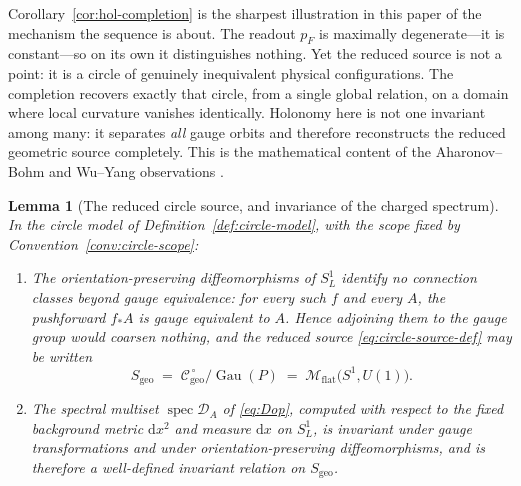 \documentclass[11pt,a4paper]{article}
\theoremstyle{plain}
\newtheorem{lemma}[theorem]{Lemma}
\theoremstyle{definition}
\theoremstyle{remark}
\newcommand{\Cgeo}{\mathcal{C}_{\mathrm{geo}}}
\newcommand{\Sgeo}{S_{\mathrm{geo}}}
\newcommand{\Gau}{\operatorname{Gau}}
\newcommand{\Mflat}{\mathcal{M}_{\mathrm{flat}}}
\begin{document}
Corollary~\ref{cor:hol-completion} is the sharpest illustration in this paper of the mechanism the
sequence is about. The readout $p_F$ is maximally degenerate---it is constant---so on its own it
distinguishes nothing. Yet the reduced source is not a point: it is a circle of genuinely
inequivalent physical configurations. The completion recovers exactly that circle, from a single
global relation, on a domain where local curvature vanishes identically. Holonomy here is not one
invariant among many: it separates \emph{all} gauge orbits and therefore reconstructs the reduced
geometric source completely. This is the mathematical content of the Aharonov--Bohm and Wu--Yang
observations \cite{AharonovBohm,WuYang}.

\begin{lemma}[The reduced circle source, and invariance of the charged spectrum]
\label{lem:spec-invariance}
In the circle model of Definition~\ref{def:circle-model}, with the scope fixed by
Convention~\ref{conv:circle-scope}:
\begin{enumerate}[label=(\arabic*),leftmargin=2.2em]
\item The orientation-preserving diffeomorphisms of $S^1_L$ identify no connection classes beyond
      gauge equivalence: for every such $f$ and every $A$, the pushforward $f_*A$ is gauge
      equivalent to $A$. Hence adjoining them to the gauge group would coarsen nothing, and the
      reduced source \eqref{eq:circle-source-def} may be written
      \begin{equation}
      \label{eq:Sgeo-circle}
      \Sgeo \;=\; \Cgeo^{\,\circ}\big/\Gau(P) \;=\; \Mflat\bigl(S^1,U(1)\bigr) .
      \end{equation}
\item The spectral multiset $\operatorname{spec}\mathcal{D}_A$ of \eqref{eq:Dop}, computed with
      respect to the fixed background metric $\mathrm{d}x^{2}$ and measure $\mathrm{d}x$ on
      $S^1_L$, is invariant under gauge transformations and under orientation-preserving
      diffeomorphisms, and is therefore a well-defined invariant relation on $\Sgeo$.
\end{enumerate}
\end{lemma}
\end{document}

